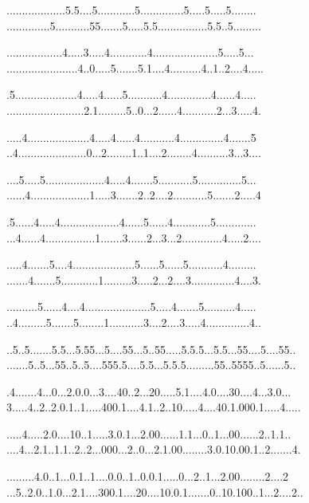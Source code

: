 \documentclass{article}
\begin{document}
\begin{figure}[h]
\centering
\begin{minipage}[t]{.5\textwidth}
\raggedright
...................5.5....5............5..............5.....5.....5........
..............5...........55.......5.....5.5................5.5..5.........

..................4.....3.....4............4.....................5.....5...
.......................4..0.....5.......5.1....4..........4..1..2....4.....

.5....................4.....4......5...........4..............4......4.....
.........................2.1.........5..0...2......4...........2...3.....4.

.....4....................4.....4......4...........4..............4.......5
..4......................0...2........1..1....2........4..........3...3....

....5.....5...................4.....4.......5...........5..............5...
......4...................1.....3.......2..2....2...........5.......2.....4

.5......4.....4...................4......5......4............5.............
...4......4................1.......3......2...3...2.............4.....2....

.....4.......5....4....................5......5......5...........4.........
.......4.......5............1.........3.....2...2....3..............4....3.

..........5......4....4.....................5.....4.......5..........4.....
..4.........5.......5........1...........3....2....3.....4..............4..



\end{minipage}%
\begin{minipage}[t]{.5\textwidth}
\raggedleft
..5..5.......5.5...5.55...5....55...5..55.....5.5.5...5.5...55....5....55..
.......5..5...55..5..5....555.5....5.5...5.5.5.........55..5555..5......5..

.4.......4...0...2.0.0...3....40..2...20.....5.1....4.0....30....4...3.0...
3.....4..2..2.0.1..1.....400.1....4.1..2..10.....4....40.1.000.1.....4.....

.....4.....2.0....10..1.....3.0.1...2.00......1.1...0..1...00......2..1.1..
....4...2.1..1.1..2..2...000...2..0...2.1.00........3.0.10.00.1..2.......4.

.........4.0..1...0.1..1....0.0..1..0.0.1.....0...2..1...2.00........2....2
...5..2.0..1.0...2.1....300.1....20....10.0.1.......0..10.100..1...2....2..


\end{minipage}
\end{figure}
\end{document}
